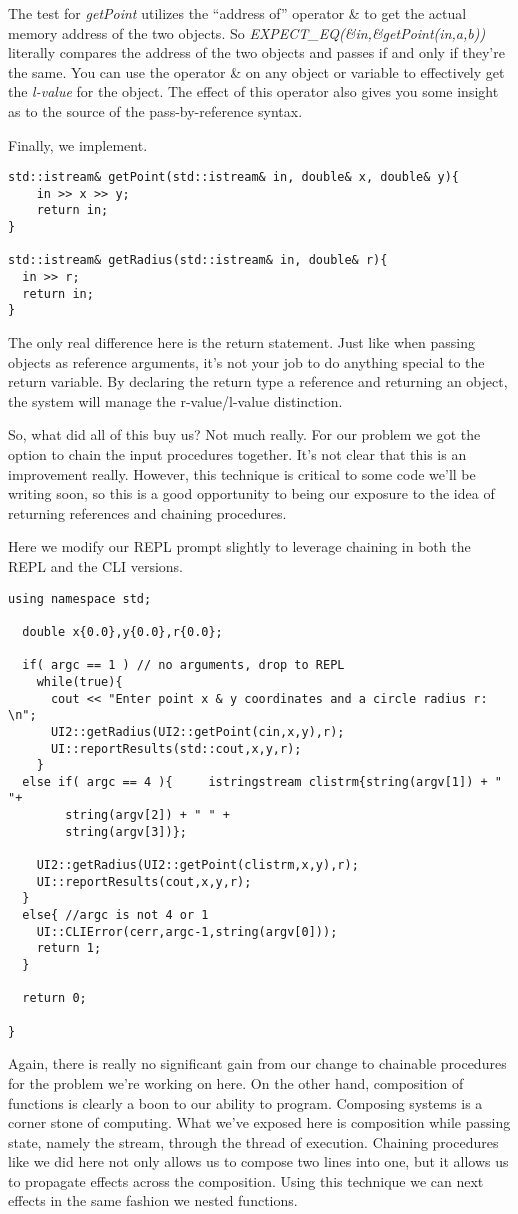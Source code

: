\documentclass[nobib]{tufte-handout}
\begin{document}
The test for \textit{getPoint} utilizes the ``address of'' operator \& to get the actual memory address of the two objects. So  \textit{EXPECT\_EQ(\&in,\&getPoint(in,a,b))} literally compares the address of the two objects and passes if and only if they're the same. You can use the operator \& on any object or variable to effectively get the \textit{l-value} for the object. The effect of this operator also gives you some insight as to the source of the pass-by-reference syntax. 

Finally, we implement.
\begin{verbatim}
std::istream& getPoint(std::istream& in, double& x, double& y){
    in >> x >> y;
    return in;
}

std::istream& getRadius(std::istream& in, double& r){
  in >> r;
  return in;
}
\end{verbatim}
The only real difference here is the return statement. Just like when passing objects as reference arguments, it's not your job to do anything special to the return variable. By declaring the return type a reference and returning an object, the system will manage the r-value/l-value distinction. 

So, what did all of this buy us? Not much really. For our problem we got the option to chain the input procedures together.  It's not clear that this is an improvement really. However, this technique is critical to some code we'll be writing soon, so this is a good opportunity to being our exposure to the idea of returning references and chaining procedures. 

Here we modify our REPL prompt slightly to leverage chaining in both the REPL and the CLI versions.
\begin{verbatim}
using namespace std;

  double x{0.0},y{0.0},r{0.0};

  if( argc == 1 ) // no arguments, drop to REPL
    while(true){
      cout << "Enter point x & y coordinates and a circle radius r: \n";
      UI2::getRadius(UI2::getPoint(cin,x,y),r);
      UI::reportResults(std::cout,x,y,r);
    }
  else if( argc == 4 ){     istringstream clistrm{string(argv[1]) + "  "+
        string(argv[2]) + " " +
        string(argv[3])};

    UI2::getRadius(UI2::getPoint(clistrm,x,y),r);
    UI::reportResults(cout,x,y,r);
  }
  else{ //argc is not 4 or 1
    UI::CLIError(cerr,argc-1,string(argv[0]));
    return 1;
  }

  return 0;

}
\end{verbatim}
Again, there is really no significant gain from our change to chainable procedures for the problem we're working on here.  On the other hand, composition of functions is clearly a boon to our ability to program. Composing systems is a corner stone of computing. What we've exposed here is composition while passing state, namely the stream, through the thread of execution.  Chaining procedures like we did here not only allows us to compose two lines into one, but it allows us to propagate effects across the composition. Using this technique we can next effects in the same fashion we nested functions. 
\end{document}
